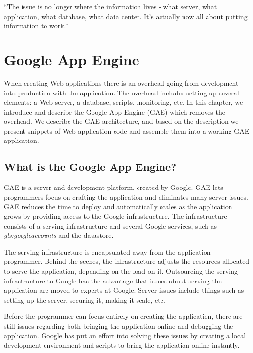 \begin{savequote}[10pc]
\sffamily 
``The issue is no longer where the information lives - what server, what
application, what database, what data center. It's actually now all about putting
information to work.''
\end{savequote}
\chapter{Google App Engine}\label{chap:gae}
When creating Web applications there is an overhead going from development into
production with the application. The overhead includes setting up several
elements: a Web server, a database, scripts, monitoring, etc. In this chapter, we
introduce and describe the Google App Engine (GAE) which removes the
overhead. We describe the GAE architecture, and based on the description we
present snippets of Web application code and assemble them into a working GAE
application.

\section{What is the Google App Engine?}
GAE is a server and development platform, created by Google. GAE lets programmers
focus on crafting the application and eliminates many server issues. GAE reduces
the time to deploy and automatically scales as the application grows by
providing access to the Google infrastructure. The infrastructure consists of a
serving infrastructure and several Google services, such as
\textit{\gls{gls:googleaccounts}} and the datastore.

The serving infrastructure is encapsulated away from the application
programmer. Behind the scenes, the infrastructure adjusts the resources allocated
to serve the application, depending on the load on it. Outsourcing the serving
infrastructure to Google has the advantage that issues about serving the
application are moved to experts at Google. Server issues include things such as
setting up the server, securing it, making it scale, etc.

Before the programmer can focus entirely on creating the application, there are
still issues regarding both bringing the application online and debugging the
application. Google has put an effort into solving these issues by creating a
local development environment and scripts to bring the application online
instantly.

